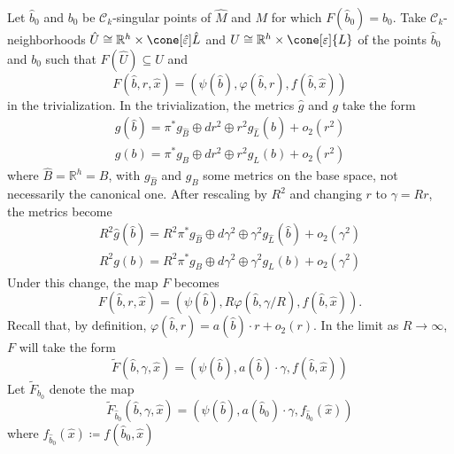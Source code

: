 \documentclass[12pt, reqno]{amsart}
\theoremstyle{plain} %
\theoremstyle{definition}
\theoremstyle{remark}
\numberwithin{equation}{section}
\newcommand{\dom}[1]{\hat{#1}}
\newcommand{\cat}[1]{\mathcal{#1}}
\newcommand{\field}[1]{\mathbb{#1}}
\newcommand{\R}{\field{R}}
\newcommand{\hdim}{h} %
\begin{document}
Let \(\dom{b}_0\) and \(b_0\) be \(\cat{C}_k\)-singular points of \(\dom{M}\) and \(M\) for which \(F(\dom{b}_0) = b_0\).
Take \(\cat{C}_k\)-neighborhoods \(\dom{U} \cong \R^\hdim \times \cone[\dom{\varepsilon}]{\dom{L}}\) and \(U \cong \R^\hdim \times \cone[\varepsilon]{L}\) of the points \(\dom{b}_0\) and \(b_0\) such that \(F(\dom{U}) \subseteq U\) and
\begin{equation*}
    F(\dom{b},r,\dom{x}) = (\psi(\dom{b}), \varphi(\dom{b},r), f(\dom{b},\dom{x}))
\end{equation*}
in the trivialization.
In the trivialization, the metrics \(\dom{g}\) and \(g\) take the form
\begin{gather*}
    \dom{g}(\dom{b}) = \pi^*g_{\dom{B}} \oplus dr^2 \oplus r^2 g_{\dom{L}}(\dom{b}) + o_2(r^2)\\
    g(b) = \pi^*g_B \oplus dr^2 \oplus r^2 g_L(b) + o_2(r^2)
\end{gather*}
where \(\dom{B} = \R^\hdim = B\), with \(g_{\dom{B}}\) and \(g_B\) some metrics on the base space, not necessarily the canonical one.
After rescaling by \(R^2\) and changing \(r\) to \(\gamma = Rr\), the metrics become
\begin{gather*}
    R^2 \dom{g}(\dom{b}) = R^2 \pi^*g_{\dom{B}} \oplus d\gamma^2 \oplus \gamma^2 g_{\dom{L}}(\dom{b}) + o_2(\gamma^2)\\
    R^2 g(b) = R^2 \pi^*g_B \oplus d\gamma^2 \oplus \gamma^2 g_L(b) + o_2(\gamma^2)
\end{gather*}
Under this change, the map \(F\) becomes
\begin{equation*}
    F(\dom{b},r,\dom{x}) = (\psi(\dom{b}), R\varphi(\dom{b},\gamma/R), f(\dom{b},\dom{x})).
\end{equation*}
Recall that, by definition, \(\varphi(\dom{b}, r) = a(\dom{b}) \cdot r + o_2(r)\).
In the limit as \(R \to \infty\), \(F\) will take the form
\begin{equation*}
    \widetilde{F}(\dom{b}, \gamma, \dom{x}) = (\psi(\dom{b}), a(\dom{b}) \cdot \gamma, f(\dom{b},\dom{x}))
\end{equation*}
Let \(\widetilde{F}_{b_0}\) denote the map
\begin{equation*}
    \widetilde{F}_{\dom{b}_0}(\dom{b}, \gamma, \dom{x}) = (\psi(\dom{b}), a(\dom{b}_0) \cdot \gamma, f_{\dom{b}_0}(\dom{x}))
\end{equation*}
where \(f_{\dom{b}_0}(\dom{x}) \coloneqq f(\dom{b}_0, \dom{x})\)
\end{document}
